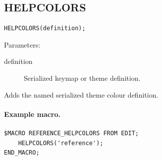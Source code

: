 \documentclass[a4paper,10pt,twoside,openany]{book}
\newenvironment{mrmacextension}{\begin{changebar}}{\end{changebar}}
\begin{document}
\begin{mrmacextension}
\label{prim:procedure-helpcolors}
\subsection*{HELPCOLORS}
\begin{verbatim}
HELPCOLORS(definition);
\end{verbatim}
Parameters:
\begin{description}
\item[definition] Serialized keymap or theme definition.
\end{description}

Adds the named serialized theme colour definition.

\paragraph{Example macro.}
\begin{verbatim}
$MACRO REFERENCE_HELPCOLORS FROM EDIT;
    HELPCOLORS('reference');
END_MACRO;
\end{verbatim}
\end{mrmacextension}
\end{document}

